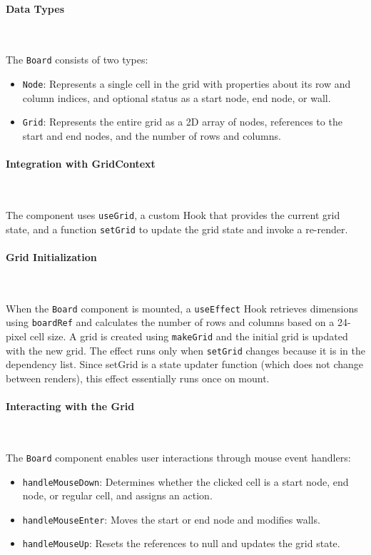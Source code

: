 \paragraph{Data Types} \

The \texttt{Board} consists of two types:
\begin{itemize}
    \item \texttt{Node}: Represents a single cell in the grid with properties about its row and column indices, and optional status as a start node, end node, or wall.
    \item \texttt{Grid}: Represents the entire grid as a 2D array of nodes, references to the start and end nodes, and the number of rows and columns.
\end{itemize}

\paragraph{Integration with GridContext} \

The component uses \texttt{useGrid}, a custom Hook that provides the current grid state, and a function \texttt{setGrid} to update the grid state and invoke a re-render.

\paragraph{Grid Initialization} \

When the \texttt{Board} component is mounted, a \texttt{useEffect} Hook retrieves dimensions using \texttt{boardRef} and calculates the number of rows and columns based on a 24-pixel cell size. A grid is created using \texttt{makeGrid} and the initial grid is updated with the new grid. The effect runs only when \texttt{setGrid} changes because it is in the dependency list. Since setGrid is a state updater function (which does not change between renders), this effect essentially runs once on mount.

\paragraph{Interacting with the Grid} \

The \texttt{Board} component enables user interactions through mouse event handlers:

\begin{itemize}
    \item \texttt{handleMouseDown}: Determines whether the clicked cell is a start node, end node, or regular cell, and assigns an action.
    \item \texttt{handleMouseEnter}: Moves the start or end node and modifies walls.
    \item \texttt{handleMouseUp}: Resets the references to null and updates the grid state.
\end{itemize}

